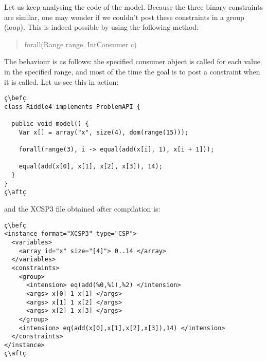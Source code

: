 \documentclass[10pt]{article}
\def\xt{{\rm XCSP3}\xspace}
\def\xt{{\rm XCSP3}\xspace}
\newenvironment{myvb}{\endgraf\small\verbatim}{\endverbatim}
\def\bef{\rule{10cm}{0.1mm}} %
\def\aft{\rule{10cm}{0.1mm}\medskip}
\begin{document}
Let us keep analysing the code of the model.
Because the three binary constraints are similar, one may wonder if we couldn't post these constraints in a group (loop).
This is indeed possible by using the following method:

\begin{quote}
\begin{myvb}
forall(Range range, IntConsumer c) 
\end{myvb}
\end{quote}


The behaviour is as follows: the specified consumer object is called for each value in the specified range, and most of the time the goal is to post a constraint when it is called.
Let us see this in action:

\begin{lstlisting}
ç\befç
class Riddle4 implements ProblemAPI {

  public void model() {
    Var x[] = array("x", size(4), dom(range(15)));
    
    forall(range(3), i -> equal(add(x[i], 1), x[i + 1]));

    equal(add(x[0], x[1], x[2], x[3]), 14);
  }
}
ç\aftç
\end{lstlisting}
and the \xt file obtained after compilation is:
\begin{lstlisting}
ç\befç
<instance format="XCSP3" type="CSP">
  <variables>
    <array id="x" size="[4]"> 0..14 </array>
  </variables>
  <constraints>
    <group>
      <intension> eq(add(%0,%1),%2) </intension>
      <args> x[0] 1 x[1] </args>
      <args> x[1] 1 x[2] </args>
      <args> x[2] 1 x[3] </args>
    </group>
    <intension> eq(add(x[0],x[1],x[2],x[3]),14) </intension>
  </constraints>
</instance>
ç\aftç
\end{lstlisting}
\end{document}
